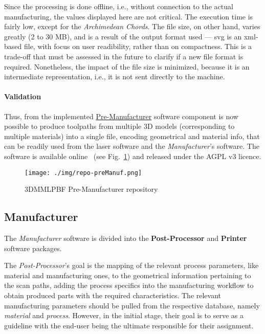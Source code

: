 Since the processing is done offline, i.e., without connection to the actual
manufacturing, the values displayed here are not critical. The execution time is
fairly low, except for the \emph{Archimedean Chords}. The file size, on other
hand, varies greatly (2 to 30 MB), and is a result of the output format used ---
\gls{svg} is an \gls{xml}-based file, with focus on user readibility, rather
than on compactness. This is a trade-off that must be assessed in the future to
clarify if a new file format is required. Nonetheless, the impact of the file
size is minimized, because it is an intermediate representation, i.e., it is
not sent directly to the machine.

\paragraph{Validation}
Thus, from the implemented \underline{Pre-Manufacturer} software component is now possible to produce toolpaths from
multiple 3D models (corresponding to multiple materials) into a single file,
encoding geometrical and material info, that can be readily
used from the laser software and the \emph{Manufacturer}'s software.
The software is available online~\cite{repoPremanuf} (see Fig.~\ref{fig:repoPremanuf}) and released
under the AGPL v3 licence.

\begin{figure}[!hbt]
  \centering
    \texttt{[image: ./img/repo-preManuf.png]}
    \caption{3DMMLPBF Pre-Manufacturer repository~\cite{repoPremanuf}}%
    \label{fig:repoPremanuf}
\end{figure}


\subsection{Manufacturer}%
\label{sec:manufacturer}
The \emph{Manufacturer} software is divided into the \textbf{Post-Processor} and
\textbf{Printer} software packages.

The \emph{Post-Processor}'s goal is the mapping of the relevant process parameters,
like material and manufacturing ones, to the geometrical information pertaining
to the scan paths, adding the process specifics into the manufacturing workflow
to obtain produced parts with the required characteristics.
The relevant manufacturing parameters should be pulled from the respective
database, namely \emph{material} and \emph{process}. However, in the initial
stage, their goal is to serve as a guideline with the end-user being the
ultimate responsible for their assignment.

